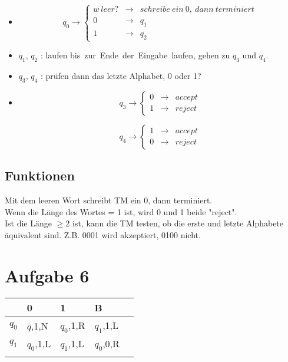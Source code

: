 \documentclass[a4paper,11pt]{scrartcl}
\begin{document}
		\begin{itemize}
			\item
			\begin{equation*}
				q_0\to\left\{
				\begin{aligned}
					w\ leer? & \to & schreibe\ ein\ 0,\ dann\ terminiert\\
					0 & \to & q_1 \\
					1 & \to & q_2 
				\end{aligned}
				\right.
			\end{equation*}
			\item $q_1$, $q_2$ : laufen bis\ zur\ Ende\ der\ Eingabe\ laufen, gehen zu $q_3$ und $q_4$.
			\item $q_3$, $q_4$ : prüfen dann das letzte Alphabet, 0 oder 1?
			\item

				\begin{equation*}
					q_3\to\left\{
					\begin{aligned}						
						0 & \to & accept \\
						1 & \to & reject 
					\end{aligned}
					\right.
				\end{equation*}
			
				\begin{equation*}
					q_4\to\left\{
					\begin{aligned}						
						1 & \to & accept \\
						0 & \to & reject
					\end{aligned}
					\right.
				\end{equation*}			
		\end{itemize}

	\subsection*{Funktionen}
		Mit dem leeren Wort schreibt TM ein 0, dann terminiert.\\
		Wenn die Länge des Wortes = 1 ist, wird 0 und 1 beide "reject".\\ 
		Ist die Länge $\ge 2$ ist, kann die TM testen, ob die erste und letzte Alphabete äquivalent sind. Z.B. 0001 wird akzeptiert, 0100 nicht.
		
	\section*{Aufgabe 6}
	
		\begin{table}[h!]
			\begin{tabular}{lllll}
				& 0                         & 1         & B         &  \\
				\hline
				$q_0$ & $\bar q$,1,N & $q_0$,1,R  & $q_1$,1,L  &  \\
				$q_1$ & $q_0$,1,L                 & $q_1$,1,L & $q_0$,0,R &  \\
				&                           &           &           & 
			\end{tabular}
		\end{table}
	
\end{document}
